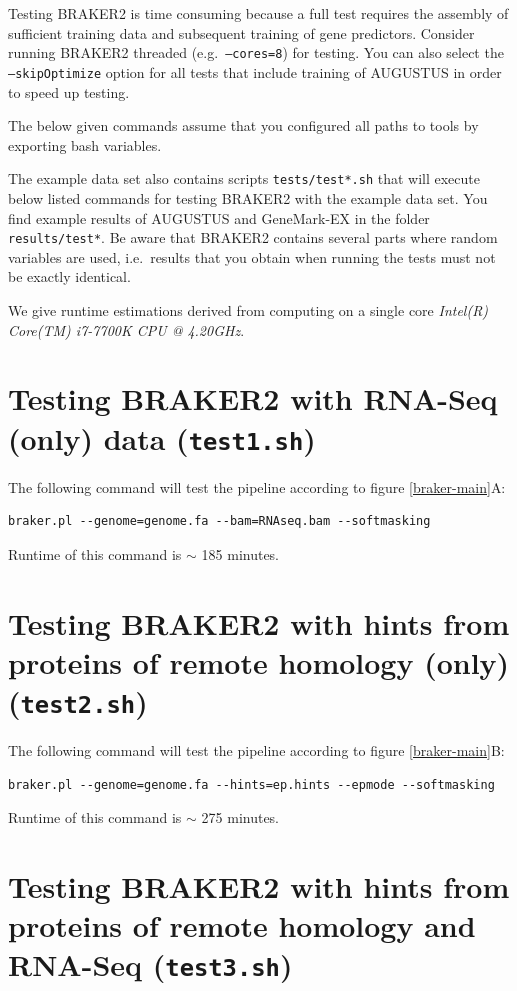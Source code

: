 \documentclass[a4paper,10pt]{report}
\begin{document}
Testing BRAKER2 is time consuming because a full test requires the assembly of sufficient training data and subsequent training of gene predictors. Consider running BRAKER2 threaded (e.g.~\texttt{--cores=8}) for testing. You can also select the \texttt{--skipOptimize} option for all tests that include training of AUGUSTUS in order to speed up testing. 

The below given commands assume that you configured all paths to tools by exporting bash variables.

The example data set also contains scripts \texttt{tests/test*.sh} that will execute below listed commands for testing BRAKER2 with the example data set. You find example results of AUGUSTUS and GeneMark-EX in the folder \texttt{results/test*}. Be aware that BRAKER2 contains several parts where random variables are used, i.e.~results that you obtain when running the tests must not be exactly identical.

We give runtime estimations derived from computing on a single core \textit{Intel(R) Core(TM) i7-7700K CPU @ 4.20GHz}.

\section{Testing BRAKER2 with RNA-Seq (only) data (\texttt{test1.sh})}

The following command will test the pipeline according to figure \ref{braker-main}A:

\begin{verbatim}
braker.pl --genome=genome.fa --bam=RNAseq.bam --softmasking
\end{verbatim}

Runtime of this command is $\sim$ 185 minutes.

\section{Testing BRAKER2 with hints from proteins of remote homology (only) (\texttt{test2.sh})}

The following command will test the pipeline according to figure \ref{braker-main}B:

\begin{verbatim}
braker.pl --genome=genome.fa --hints=ep.hints --epmode --softmasking
\end{verbatim}

Runtime of this command is $\sim$ 275 minutes.

\section{Testing BRAKER2 with hints from proteins of remote homology and RNA-Seq (\texttt{test3.sh})}
\end{document}
